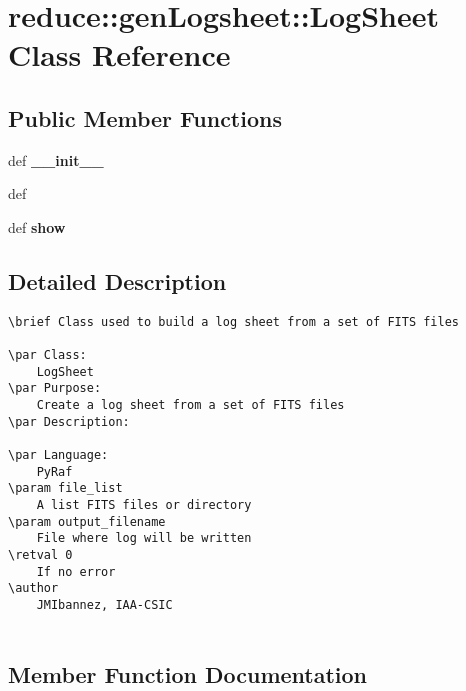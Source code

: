 \section{reduce::gen\-Logsheet::Log\-Sheet Class Reference}
\label{classreduce_1_1genLogsheet_1_1LogSheet}
\subsection*{Public Member Functions}
\begin{CompactItemize}
\item 
def \textbf{\_\-\_\-init\_\-\_\-}\label{classreduce_1_1genLogsheet_1_1LogSheet_cce5f737edd43ea9388d47d736076057}

\item 
def {\bfcreate}
\item 
def \textbf{show}\label{classreduce_1_1genLogsheet_1_1LogSheet_8c7036f43a7532138fbfa0bc89f0e094}

\end{CompactItemize}


\subsection{Detailed Description}


\footnotesize\begin{verbatim}
\brief Class used to build a log sheet from a set of FITS files 

\par Class:
    LogSheet
\par Purpose:
    Create a log sheet from a set of FITS files
\par Description:
        
\par Language:
    PyRaf
\param file_list
    A list FITS files or directory
\param output_filename
    File where log will be written
\retval 0
    If no error
\author
    JMIbannez, IAA-CSIC
    
\end{verbatim}
\normalsize
 



\subsection{Member Function Documentation}
